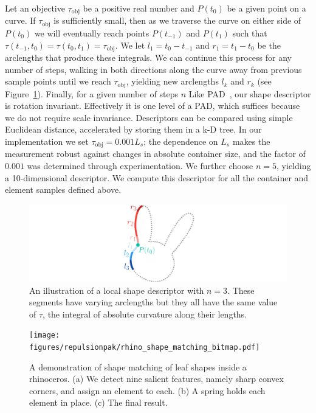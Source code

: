 Let an objective $\tau_\mathrm{obj}$ be a positive real number and $P(t_0)$ be a given point on a curve.  If $\tau_\mathrm{obj}$ is sufficiently small, then as we traverse the curve on either side of $P(t_0)$ we will eventually reach points $P(t_{-1})$ and $P(t_1)$ such that $\tau(t_{-1},t_0)=\tau(t_0,t_1)=\tau_\mathrm{obj}$.  We let $l_1=t_0-t_{-1}$ and $r_1=t_1-t_0$ be the arclengths that produce these integrals.  We can continue this process for any number of steps, walking in both directions along the curve away from previous sample points until we reach $\tau_\mathrm{obj}$, yielding new arclengths $l_k$ and $r_k$ (see Figure~\ref{fig_shape_matching}).  Finally, for a given number of steps $n$ 
Like PAD~\cite{Kwan2016}, our shape descriptor is rotation 
invariant.  Effectively it is one level of a PAD, which suffices because
we do not require scale invariance.
Descriptors can be compared using simple Euclidean distance, accelerated
by storing them in a k-D tree.
In our implementation we set $\tau_\mathrm{obj}=0.001L_s$; the dependence
on $L_s$ makes the measurement robust against changes in absolute container
size, and the factor of $0.001$ was determined through experimentation.
We further choose $n=5$, yielding a 10-dimensional descriptor. We compute
this descriptor for all the container and element samples defined above.

\begin{figure}[t]
\centering
\includegraphics[width=1.0\textwidth]{figures/repulsionpak/descriptor_2.pdf}
\caption[A local shape descriptor for shape matching]
{\label{fig_shape_matching}
An illustration of a local shape descriptor with $n = 3$. 
These segments have varying arclengths but they all have the same value
of $\tau$, the integral of absolute curvature along their lengths.
}
\end{figure}

\begin{figure}[t]
\centering
\texttt{[image: figures/repulsionpak/rhino\_shape\_matching\_bitmap.pdf]} 
\caption[A demonstration of shape matching to place elements]
{\label{rhino_packing}
{ 
A demonstration of shape matching of leaf shapes inside a rhinoceros. 
(a) We detect nine salient features, namely sharp convex corners, and 
assign an element to each.
(b) A spring holds each element in place.
(c) The final result.
}
}
\end{figure}

